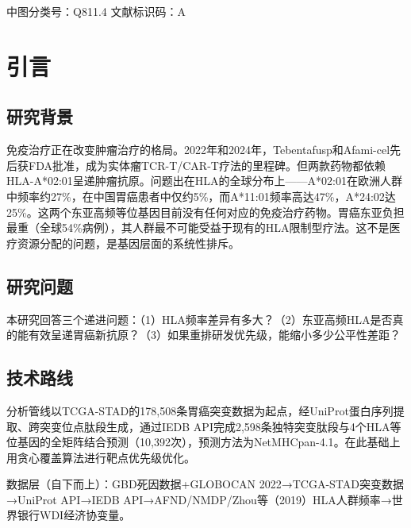 \documentclass[12pt,a4paper]{ctexart}
\begin{document}
\vspace{0.5cm}
{\heiti 中图分类号：}Q811.4 \hspace{1cm} {\heiti 文献标识码：}A

\newpage


\section{引言}

\subsection{研究背景}

免疫治疗正在改变肿瘤治疗的格局。2022年和2024年，Tebentafusp和Afami-cel先后获FDA批准，成为实体瘤TCR-T/CAR-T疗法的里程碑\cite{ref1,ref2}。但两款药物都依赖HLA-A*02:01呈递肿瘤抗原。问题出在HLA的全球分布上——A*02:01在欧洲人群中频率约27\%，在中国胃癌患者中仅约5\%，而A*11:01频率高达47\%，A*24:02达25\%。这两个东亚高频等位基因目前没有任何对应的免疫治疗药物。胃癌东亚负担最重（全球54\%病例），其人群最不可能受益于现有的HLA限制型疗法。这不是医疗资源分配的问题，是基因层面的系统性排斥。

\subsection{研究问题}

本研究回答三个递进问题：（1）HLA频率差异有多大？（2）东亚高频HLA是否真的能有效呈递胃癌新抗原？（3）如果重排研发优先级，能缩小多少公平性差距？

\subsection{技术路线}

分析管线以TCGA-STAD\cite{ref3}的178,508条胃癌突变数据为起点，经UniProt\cite{ref4}蛋白序列提取、跨突变位点肽段生成，通过IEDB API\cite{ref5}完成2,598条独特突变肽段与4个HLA等位基因的全矩阵结合预测（10,392次），预测方法为NetMHCpan-4.1\cite{ref6}。在此基础上用贪心覆盖算法进行靶点优先级优化。

数据层（自下而上）：GBD死因数据\cite{ref7}+GLOBOCAN 2022\cite{ref8}→TCGA-STAD突变数据→UniProt API→IEDB API→AFND\cite{ref10}/NMDP/Zhou等（2019）\cite{ref9}HLA人群频率→世界银行WDI经济协变量。

\newpage

\end{document}

